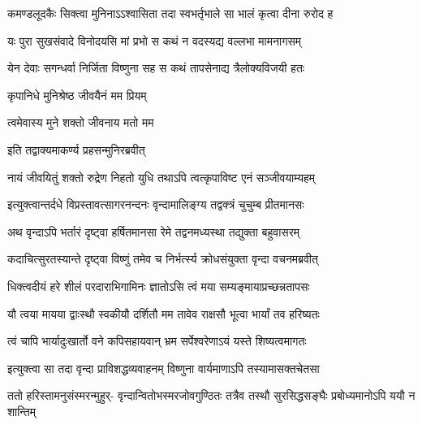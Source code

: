 \twolineshloka
{कमण्डलूदकैः सिक्त्वा मुनिनाऽऽश्वासिता तदा}
{स्वभर्तृभाले सा भालं कृत्वा दीना रुरोद ह} %


\twolineshloka
{यः पुरा सुखसंवादे विनोदयसि मां प्रभो}
{स कथं न वदस्यद्य वल्लभा मामनागसम्} %

\twolineshloka
{येन देवाः सगन्धर्वा निर्जिता विष्णुना सह}
{स कथं तापसेनाद्य त्रैलोक्यविजयी हतः} %





\onelineshloka
{कृपानिधे मुनिश्रेष्ठ जीवयैनं मम प्रियम्} %


त्वमेवास्य मुने शक्तो जीवनाय मतो मम


\onelineshloka
{इति तद्वाक्यमाकर्ण्य प्रहसन्मुनिरब्रवीत्} %


\twolineshloka
{नायं जीवयितुं शक्तो रुद्रेण निहतो युधि}
{तथाऽपि त्वत्कृपाविष्ट एनं सञ्जीवयाम्यहम्} %


\twolineshloka
{इत्युक्त्वान्तर्दधे विप्रस्तावत्सागरनन्दनः}
{वृन्दामालिङ्ग्य तद्वक्त्रं चुचुम्ब प्रीतमानसः} %

\twolineshloka
{अथ वृन्दाऽपि भर्तारं दृष्ट्वा हर्षितमानसा}
{रेमे तद्वनमध्यस्था तद्युक्ता बहुवासरम्} %

\twolineshloka
{कदाचित्सुरतस्यान्ते दृष्ट्वा विष्णुं तमेव च}
{निर्भर्त्स्य क्रोधसंयुक्ता वृन्दा वचनमब्रवीत्} %


\twolineshloka
{धिक्त्वदीयं हरे शीलं परदाराभिगामिनः}
{ज्ञातोऽसि त्वं मया सम्यङ्मायाप्रच्छन्नतापसः} %

\twolineshloka
{यौ त्वया मायया द्वाःस्थौ स्वकीयौ दर्शितौ मम}
{तावेव राक्षसौ भूत्वा भार्यां तव हरिष्यतः} %

\twolineshloka
{त्वं चापि भार्यादुःखार्तो वने कपिसहायवान्}
{भ्रम सर्पेश्वरेणाऽयं यस्ते शिष्यत्वमागतः} %

\twolineshloka
{इत्युक्त्वा सा तदा वृन्दा प्राविशद्धव्यवाहनम्}
{विष्णुना वार्यमाणाऽपि तस्यामासक्तचेतसा} %

\fourlineindentedshloka
{ततो हरिस्तामनुसंस्मरन्मुहुर्-}
{वृन्दान्वितोभस्मरजोवगुण्ठितः}
{तत्रैव तस्थौ सुरसिद्धसङ्घैः}
{प्रबोध्यमानोऽपि ययौ न शान्तिम्} %





